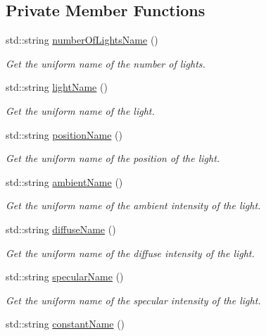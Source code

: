 \subsection*{Private Member Functions}
\begin{DoxyCompactItemize}
\item 
std\+::string \hyperlink{classPointLight_a52eca397963df514af41178aec06dacf}{number\+Of\+Lights\+Name} ()
\begin{DoxyCompactList}\small\item\em Get the uniform name of the number of lights. \end{DoxyCompactList}\item 
std\+::string \hyperlink{classPointLight_a7c797f6ef8ae47d4ba86747731ed1e91}{light\+Name} ()
\begin{DoxyCompactList}\small\item\em Get the uniform name of the light. \end{DoxyCompactList}\item 
std\+::string \hyperlink{classPointLight_a270bf32badcf99da825c752ade0fca03}{position\+Name} ()
\begin{DoxyCompactList}\small\item\em Get the uniform name of the position of the light. \end{DoxyCompactList}\item 
std\+::string \hyperlink{classPointLight_a7a164908b6773d1607d303d7a05e9370}{ambient\+Name} ()
\begin{DoxyCompactList}\small\item\em Get the uniform name of the ambient intensity of the light. \end{DoxyCompactList}\item 
std\+::string \hyperlink{classPointLight_a8aa0ba053b1c4b5a4a6525dc94f1298b}{diffuse\+Name} ()
\begin{DoxyCompactList}\small\item\em Get the uniform name of the diffuse intensity of the light. \end{DoxyCompactList}\item 
std\+::string \hyperlink{classPointLight_a7f02ce1e373b96b445916db3c7397921}{specular\+Name} ()
\begin{DoxyCompactList}\small\item\em Get the uniform name of the specular intensity of the light. \end{DoxyCompactList}\item 
std\+::string \hyperlink{classPointLight_a4b08c94d77d9b1d8b858ecf834bb4aa6}{constant\+Name} ()

\end{DoxyCompactItemize}

